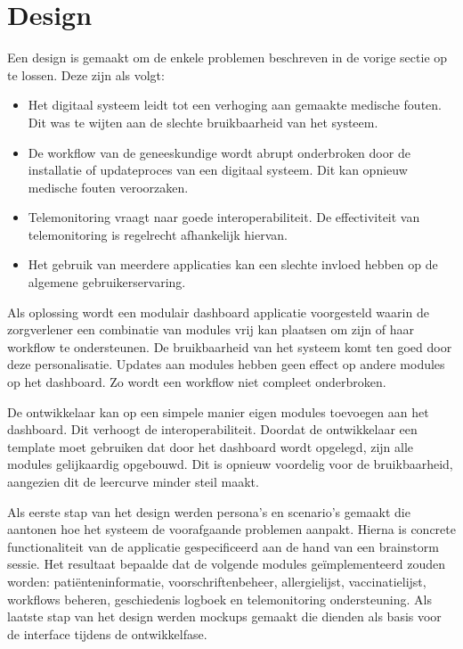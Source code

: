 \documentclass{article}
\begin{document}
\section{Design}

Een design is gemaakt om de enkele problemen beschreven in de vorige sectie op te lossen. Deze zijn als volgt:
\begin{itemize}
    \item Het digitaal systeem leidt tot een verhoging aan gemaakte medische fouten. Dit was te wijten aan de slechte bruikbaarheid van het systeem.
    \item De workflow van de geneeskundige wordt abrupt onderbroken door de installatie of updateproces van een digitaal systeem. Dit kan opnieuw medische fouten veroorzaken.
    \item Telemonitoring vraagt naar goede interoperabiliteit. De effectiviteit van telemonitoring is regelrecht afhankelijk hiervan.
    \item Het gebruik van meerdere applicaties kan een slechte invloed hebben op de algemene gebruikerservaring.
\end{itemize}

\noindent Als oplossing wordt een modulair dashboard applicatie voorgesteld waarin de zorgverlener een combinatie van modules vrij kan plaatsen om zijn of haar workflow te ondersteunen. De bruikbaarheid van het systeem komt ten goed door deze personalisatie. Updates aan modules hebben geen effect op andere modules op het dashboard. Zo wordt een workflow niet compleet onderbroken.

De ontwikkelaar kan op een simpele manier eigen modules toevoegen aan het dashboard. Dit verhoogt de interoperabiliteit. Doordat de ontwikkelaar een template moet gebruiken dat door het dashboard wordt opgelegd, zijn alle modules gelijkaardig opgebouwd. Dit is opnieuw voordelig voor de bruikbaarheid, aangezien dit de leercurve minder steil maakt.

Als eerste stap van het design werden persona's en scenario's gemaakt die aantonen hoe het systeem de voorafgaande problemen aanpakt. Hierna is concrete functionaliteit van de applicatie gespecificeerd aan de hand van een brainstorm sessie. Het resultaat bepaalde dat de volgende modules ge\"{i}mplementeerd zouden worden: pati\"{e}nteninformatie, voorschriftenbeheer, allergielijst, vaccinatielijst, workflows beheren, geschiedenis logboek en telemonitoring ondersteuning. Als laatste stap van het design werden mockups gemaakt die dienden als basis voor de interface tijdens de ontwikkelfase.
\end{document}
